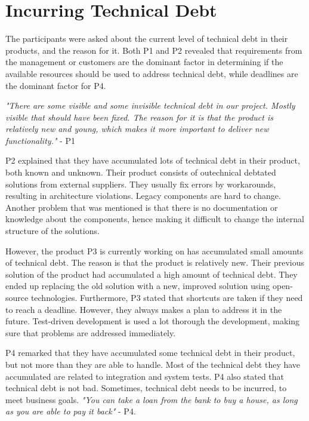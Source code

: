 \section{Incurring Technical Debt}
\label{sec:prior}
The participants were asked about the current level of technical debt in their products, and the reason for it. Both P1 and P2 revealed that requirements from the management or customers are the dominant factor in determining if the available resources should be used to address technical debt, while deadlines are the dominant factor for P4. 

\begin{displayquote}
\textit{"There are some visible and some invisible technical debt in our project. Mostly visible that should have been fixed. The reason for it is that the product is relatively new and young, which makes it more important to deliver new functionality."} - P1
\end{displayquote} 

P2 explained that they have accumulated lots of technical debt in their product, both known and unknown. Their product consists of outechnical debtated solutions from external suppliers. They usually fix errors by workarounds, resulting in architecture violations. Legacy components are hard to change. Another problem that was mentioned is that there is no documentation or knowledge about the components, hence making it difficult to change the internal structure of the solutions.

However, the product P3 is currently working on has accumulated small amounts of technical debt. The reason is that the product is relatively new. Their previous solution of the product had accumulated a high amount of technical debt. They ended up replacing the old solution with a new, improved solution using open-source technologies. Furthermore, P3 stated that shortcuts are taken if they need to reach a deadline. However, they always makes a plan to address it in the future. Test-driven development is used a lot thorough the development, making sure that problems are addressed immediately.

P4 remarked that they have accumulated some technical debt in their product, but not more than they are able to handle. Most of the technical debt they have accumulated are related to integration and system tests. P4 also stated that technical debt is not bad. Sometimes, technical debt needs to be incurred, to meet business goals. \textit{"You can take a loan from the bank to buy a house, as long as you are able to pay it back"} - P4.

